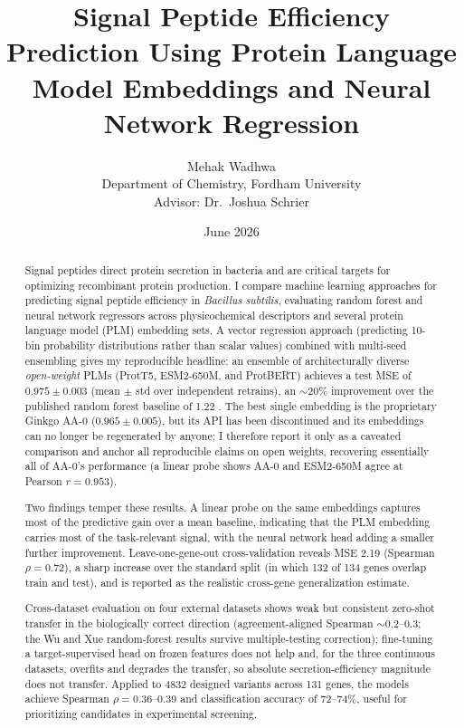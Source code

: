 \documentclass[12pt]{article}
\title{\textbf{Signal Peptide Efficiency Prediction Using Protein Language Model Embeddings and Neural Network Regression}}
\author{
  Mehak Wadhwa \\
  Department of Chemistry, Fordham University \\
  Advisor: Dr.\ Joshua Schrier
}
\date{June 2026}
\begin{document}
\maketitle

\begin{abstract}
Signal peptides direct protein secretion in bacteria and are critical targets for optimizing recombinant protein production.
I compare machine learning approaches for predicting signal peptide efficiency in \textit{Bacillus subtilis}, evaluating random forest and neural network regressors across physicochemical descriptors and several protein language model (PLM) embedding sets.
A vector regression approach (predicting 10-bin probability distributions rather than scalar values) combined with multi-seed ensembling gives my reproducible headline: an ensemble of architecturally diverse \emph{open-weight} PLMs (ProtT5, ESM2-650M, and ProtBERT) achieves a test MSE of $0.975 \pm 0.003$ (mean $\pm$ std over independent retrains), an ${\sim}20\%$ improvement over the published random forest baseline of 1.22 \citep{grasso2023}.
The best single embedding is the proprietary Ginkgo AA-0 ($0.965 \pm 0.005$), but its API has been discontinued and its embeddings can no longer be regenerated by anyone; I therefore report it only as a caveated comparison and anchor all reproducible claims on open weights, recovering essentially all of AA-0's performance (a linear probe shows AA-0 and ESM2-650M agree at Pearson $r = 0.953$).

Two findings temper these results.
A linear probe on the same embeddings captures most of the predictive gain over a mean baseline, indicating that the PLM embedding carries most of the task-relevant signal, with the neural network head adding a smaller further improvement.
Leave-one-gene-out cross-validation reveals MSE 2.19 (Spearman $\rho = 0.72$), a sharp increase over the standard split (in which 132 of 134 genes overlap train and test), and is reported as the realistic cross-gene generalization estimate.

Cross-dataset evaluation on four external datasets shows weak but consistent zero-shot transfer in the biologically correct direction (agreement-aligned Spearman ${\sim}0.2$--$0.3$; the Wu and Xue random-forest results survive multiple-testing correction); fine-tuning a target-supervised head on frozen features does not help and, for the three continuous datasets, overfits and degrades the transfer, so absolute secretion-efficiency magnitude does not transfer.
Applied to 4832 designed variants across 131 genes, the models achieve Spearman $\rho = 0.36$--0.39 and classification accuracy of 72--74\%, useful for prioritizing candidates in experimental screening.
\end{abstract}
\end{document}
